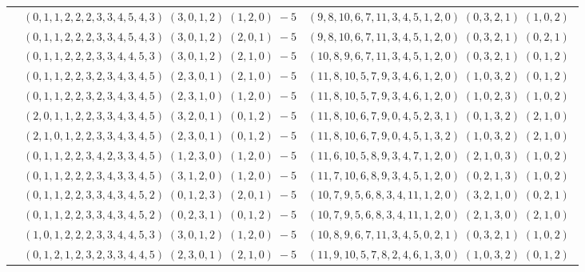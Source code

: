 \documentclass[11pt]{article}
\begin{document}
\begin{longtable}[l]{|c|c|c|}
 \cline{2-3} 
 & $(0 ,1 ,1 ,2 ,2 ,2 ,3 ,3 ,4 ,5 ,4 ,3) \;(3 ,0 ,1 ,2) \;(1 ,2 ,0) \;-5$ & $(9 ,8 ,10 ,6 ,7 ,11 ,3 ,4 ,5 ,1 ,2 ,0) \;(0 ,3 ,2 ,1) \;(1 ,0 ,2) \;$\\ 
 \cline{2-3} 
 & $(0 ,1 ,1 ,2 ,2 ,2 ,3 ,3 ,4 ,5 ,4 ,3) \;(3 ,0 ,1 ,2) \;(2 ,0 ,1) \;-5$ & $(9 ,8 ,10 ,6 ,7 ,11 ,3 ,4 ,5 ,1 ,2 ,0) \;(0 ,3 ,2 ,1) \;(0 ,2 ,1) \;$\\ 
 \cline{2-3} 
 & $(0 ,1 ,1 ,2 ,2 ,2 ,3 ,3 ,4 ,4 ,5 ,3) \;(3 ,0 ,1 ,2) \;(2 ,1 ,0) \;-5$ & $(10 ,8 ,9 ,6 ,7 ,11 ,3 ,4 ,5 ,1 ,2 ,0) \;(0 ,3 ,2 ,1) \;(0 ,1 ,2) \;$\\ 
 \cline{2-3} 
 & $(0 ,1 ,1 ,2 ,2 ,3 ,2 ,3 ,4 ,3 ,4 ,5) \;(2 ,3 ,0 ,1) \;(2 ,1 ,0) \;-5$ & $(11 ,8 ,10 ,5 ,7 ,9 ,3 ,4 ,6 ,1 ,2 ,0) \;(1 ,0 ,3 ,2) \;(0 ,1 ,2) \;$\\ 
 \cline{2-3} 
 & $(0 ,1 ,1 ,2 ,2 ,3 ,2 ,3 ,4 ,3 ,4 ,5) \;(2 ,3 ,1 ,0) \;(1 ,2 ,0) \;-5$ & $(11 ,8 ,10 ,5 ,7 ,9 ,3 ,4 ,6 ,1 ,2 ,0) \;(1 ,0 ,2 ,3) \;(1 ,0 ,2) \;$\\ 
 \cline{2-3} 
 & $(2 ,0 ,1 ,1 ,2 ,2 ,3 ,3 ,4 ,3 ,4 ,5) \;(3 ,2 ,0 ,1) \;(0 ,1 ,2) \;-5$ & $(11 ,8 ,10 ,6 ,7 ,9 ,0 ,4 ,5 ,2 ,3 ,1) \;(0 ,1 ,3 ,2) \;(2 ,1 ,0) \;$\\ 
 \cline{2-3} 
 & $(2 ,1 ,0 ,1 ,2 ,2 ,3 ,3 ,4 ,3 ,4 ,5) \;(2 ,3 ,0 ,1) \;(0 ,1 ,2) \;-5$ & $(11 ,8 ,10 ,6 ,7 ,9 ,0 ,4 ,5 ,1 ,3 ,2) \;(1 ,0 ,3 ,2) \;(2 ,1 ,0) \;$\\ 
 \cline{2-3} 
 & $(0 ,1 ,1 ,2 ,2 ,3 ,4 ,2 ,3 ,3 ,4 ,5) \;(1 ,2 ,3 ,0) \;(1 ,2 ,0) \;-5$ & $(11 ,6 ,10 ,5 ,8 ,9 ,3 ,4 ,7 ,1 ,2 ,0) \;(2 ,1 ,0 ,3) \;(1 ,0 ,2) \;$\\ 
 \cline{2-3} 
 & $(0 ,1 ,1 ,2 ,2 ,2 ,3 ,4 ,3 ,3 ,4 ,5) \;(3 ,1 ,2 ,0) \;(1 ,2 ,0) \;-5$ & $(11 ,7 ,10 ,6 ,8 ,9 ,3 ,4 ,5 ,1 ,2 ,0) \;(0 ,2 ,1 ,3) \;(1 ,0 ,2) \;$\\ 
 \cline{2-3} 
 & $(0 ,1 ,1 ,2 ,2 ,3 ,3 ,4 ,3 ,4 ,5 ,2) \;(0 ,1 ,2 ,3) \;(2 ,0 ,1) \;-5$ & $(10 ,7 ,9 ,5 ,6 ,8 ,3 ,4 ,11 ,1 ,2 ,0) \;(3 ,2 ,1 ,0) \;(0 ,2 ,1) \;$\\ 
 \cline{2-3} 
 & $(0 ,1 ,1 ,2 ,2 ,3 ,3 ,4 ,3 ,4 ,5 ,2) \;(0 ,2 ,3 ,1) \;(0 ,1 ,2) \;-5$ & $(10 ,7 ,9 ,5 ,6 ,8 ,3 ,4 ,11 ,1 ,2 ,0) \;(2 ,1 ,3 ,0) \;(2 ,1 ,0) \;$\\ 
 \cline{2-3} 
 & $(1 ,0 ,1 ,2 ,2 ,2 ,3 ,3 ,4 ,4 ,5 ,3) \;(3 ,0 ,1 ,2) \;(1 ,2 ,0) \;-5$ & $(10 ,8 ,9 ,6 ,7 ,11 ,3 ,4 ,5 ,0 ,2 ,1) \;(0 ,3 ,2 ,1) \;(1 ,0 ,2) \;$\\ 
 \cline{2-3} 
 & $(0 ,1 ,2 ,1 ,2 ,3 ,2 ,3 ,3 ,4 ,4 ,5) \;(2 ,3 ,0 ,1) \;(2 ,1 ,0) \;-5$ & $(11 ,9 ,10 ,5 ,7 ,8 ,2 ,4 ,6 ,1 ,3 ,0) \;(1 ,0 ,3 ,2) \;(0 ,1 ,2) \;$\\ 

\end{longtable}
\end{document}
